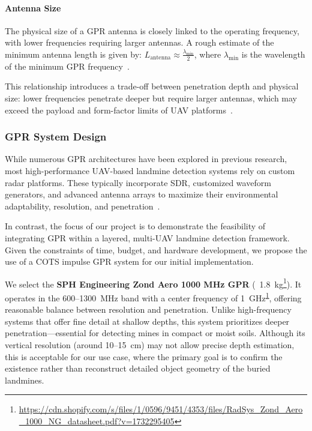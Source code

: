 \paragraph{Antenna Size}

The physical size of a \gls{GPR} antenna is closely linked to the operating frequency, with lower frequencies requiring larger antennas. A rough estimate of the minimum antenna length is given by: \(L_{\text{antenna}} \approx \frac{\lambda_{\text{min}}}{2}\), where $\lambda_{\text{min}}$ is the wavelength of the minimum \gls{GPR} frequency~\cite{burr2018design}.

This relationship introduces a trade-off between penetration depth and physical size: lower frequencies penetrate deeper but require larger antennas, which may exceed the payload and form-factor limits of \gls{UAV} platforms~\cite{alqudsi2021review}.



\subsubsection{\gls{GPR} System Design}\label{GPR_design}

While numerous \gls{GPR} architectures have been explored in previous research, most high-performance \gls{UAV}-based landmine detection systems rely on custom radar platforms. These typically incorporate \gls{SDR}, customized waveform generators, and advanced antenna arrays to maximize their environmental adaptability, resolution, and penetration~\cite{cerquera2017uav}.

In contrast, the focus of our project is to demonstrate the feasibility of integrating \gls{GPR} within a layered, multi-\gls{UAV} landmine detection framework. Given the constraints of time, budget, and hardware development, we propose the use of a \gls{COTS} impulse \gls{GPR} system for our initial implementation.

We select the \textbf{SPH Engineering Zond Aero 1000 MHz \gls{GPR}} (~1.8~kg\footnote{\label{Zond}\url{https://cdn.shopify.com/s/files/1/0596/9451/4353/files/RadSys_Zond_Aero_1000_NG_datasheet.pdf?v=1732295405}}). It operates in the 600–1300~MHz band with a center frequency of 1~GHz\textsuperscript{\ref{Zond}}, offering reasonable balance between resolution and penetration. Unlike high-frequency systems that offer fine detail at shallow depths, this system prioritizes deeper penetration—essential for detecting mines in compact or moist soils. Although its vertical resolution (around 10--15~cm) may not allow precise depth estimation, this is acceptable for our use case, where the primary goal is to confirm the existence rather than reconstruct detailed object geometry of the buried landmines.

